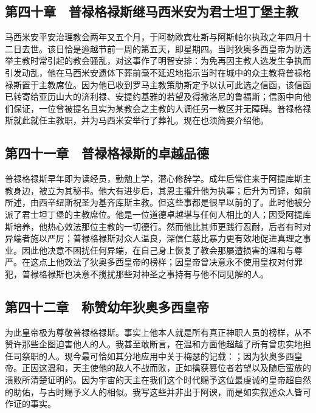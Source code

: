 
\subsection{第四十章　普禄格禄斯继马西米安为君士坦丁堡主教}

马西米安平安治理教会两年又五个月，于阿勒欧宾杜斯与阿斯帕尔执政之年四月十二日去世。该日恰是逾越节前一周的第五天，即星期四。当时狄奥多西皇帝为防选举主教时常引起的教会骚乱，对这事作了明智安排：为免再因主教人选发生争执而引发动乱，他在马西米安遗体下葬前毫不延迟地指示当时在城中的众主教将普禄格禄斯置于主教席位。因为他已收到罗马主教策肋斯定予以认可此选之信函，该信函已转寄给亚历山大的济利禄、安提约基雅的若望及得撒洛尼的鲁福斯；信函中向他们保证，一位曾被提名且实为某教会之主教的人调任另一教区并无障碍。普禄格禄斯就此就任主教职，并为马西米安举行了葬礼。现在也须简要介绍他。\par


\subsection{第四十一章　普禄格禄斯的卓越品德}

普禄格禄斯早年即为读经员，勤勉上学，潜心修辞学。成年后常住来于阿提库斯主教身边，被立为其秘书。他大有进步后，其恩主擢升他为执事；后升为司铎，如前所述，由西辛纽斯祝圣为基齐库斯主教。但这些事都是很早以前的了。此时他被分派了君士坦丁堡的主教席位。他是一位道德卓越堪与任何人相比的人；因受阿提库斯培养，他热心效法那位主教的一切德行。然而他比其师更践行忍耐，后者有时对异端者施以严厉；普禄格禄斯对众人温良，深信仁慈比暴力更有效地促进真理之事业。因此他决意不困扰任何异端，在自己身上恢复了教会那屡遭损害的温和与尊严。在这点上他效法了狄奥多西皇帝的榜样；因皇帝曾决意永不使用皇权对付罪犯，普禄格禄斯也决意不搅扰那些对神圣之事持有与他不同见解的人。\par


\subsection{第四十二章　称赞幼年狄奥多西皇帝}

为此皇帝极为尊敬普禄格禄斯。事实上他本人就是所有真正神职人员的榜样，从不赞许那些企图迫害他人的人。我甚至敢断言，在温和方面他超越了所有曾忠实地担任司祭职的人。现今最可恰如其分地应用中关于梅瑟的记载：；因为狄奥多西皇帝。正因这温和，天主使他的敌人不战而败，正如擒获篡位者若望以及随后蛮族的溃败所清楚证明的。因为宇宙的天主在我们这个时代赐予这位最虔诚的皇帝超自然的助佑，与古时赐予义人的相似。我写这些并非出于阿谀，而是如实叙述众人皆可作证的事实。\par

